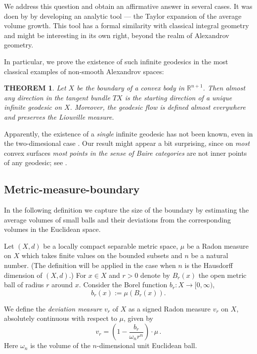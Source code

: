 \documentclass[12pt,leqno,intlimits]{amsart}
\numberwithin{equation}{section}
\newtheorem{thm}{THEOREM}[section]
\theoremstyle{definition}
\theoremstyle{remark}
\def\:{\colon}
\begin{document}
We address this question and obtain an affirmative answer in several cases.
It was doen by by developing  an analytic tool --- the Taylor expansion of the average volume growth.
This tool has a formal similarity with  classical integral geometry
and might be interesting in its own right, beyond the realm of Alexandrov geometry.

In particular, we prove the existence of such  infinite geodesics in the most classical examples of non-smooth Alexandrov spaces:

\begin{thm} \label{thmfirst}
Let $X$ be the boundary of a convex body in $\mathbb R^{n+1}$.
Then almost any direction in the tangent bundle $TX$
is the starting direction of a unique  infinite geodesic on $X$.
Moreover, the geodesic flow is defined  almost everywhere and  preserves the Liouville measure.
\end{thm}

Apparently, the existence of a \emph{single} infinite geodesic has not been known,  even in the two-dimesional case \cite{Zam-quest}.
Our result might  appear a bit surprising,
since on \emph{most} convex surfaces \emph{most points in the sense of Baire categories}   are not inner points of any geodesic;
see \cite{Zam-inv}.


 \subsection{Metric-measure-boundary}
In the following definition we capture the size of the boundary by estimating the average volumes of small balls and their deviations from the corresponding  volumes in the Euclidean space.

Let $(X,d)$ be a locally compact separable metric space,
$\mu$ be a  Radon  measure on $X$ which takes finite values on the bounded subsets
and  $n$ be a natural number.%
(The definition will be applied in the case when $n$ is the Hausdorff dimension of $(X,d)$.)
For $x\in X$ and $r>0$
denote by $B_r (x)$ the open metric ball of radius $r$ around  $x$. Consider  the Borel function $b_r\:X\to [0,\infty )$,
\begin{equation}
 b_r(x):=\mu (B_r (x)).
 \end{equation}

We define the \emph{deviation measure} $v_r$ of $X$ as a signed Radon measure $v_r$ on $X$, absolutely continuous with respect to $\mu$,   given by
\begin{equation} \label{eq:first}
 v_r  = (1 - \frac {b_r} { \omega _n r^n} )\cdot \mu \, .
\end{equation}
Here $\omega _n$ is the volume of the $n$-dimensional unit Euclidean ball.
\end{document}
